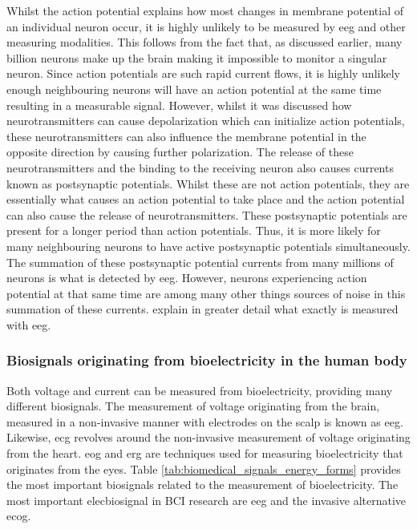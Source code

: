 Whilst the action potential explains how most changes in membrane potential of an individual neuron occur, it is highly unlikely to be measured by \gls{eeg} and other measuring modalities.
This follows from the fact that, as discussed earlier, many billion neurons make up the brain making it impossible to monitor a singular neuron.
Since action potentials are such rapid current flows, it is highly unlikely enough neighbouring neurons will have an action potential at the same time resulting in a measurable signal.
However, whilst it was discussed how neurotransmitters can cause depolarization which can initialize action potentials, these neurotransmitters can also influence the membrane potential in the opposite direction by causing further polarization.
The release of these neurotransmitters and the binding to the receiving neuron also causes currents known as postsynaptic potentials.
Whilst these are not action potentials, they are essentially what causes an action potential to take place and the action potential can also cause the release of neurotransmitters.
These postsynaptic potentials are present for a longer period than action potentials.
Thus, it is more likely for many neighbouring neurons to have active postsynaptic potentials simultaneously.
The summation of these postsynaptic potential currents from many millions of neurons is what is detected by \gls{eeg}.
However, neurons experiencing action potential at that same time are among many other things sources of noise in this summation of these currents.
 explain in greater detail what exactly is measured with \gls{eeg}.




\subsubsection{Biosignals originating from bioelectricity in the human body}
\label{subsubsec:biomedical_signals_biosignals_electrical_biosignals}

Both voltage and current can be measured from bioelectricity, providing many different \glspl{biosignal}.
The measurement of voltage originating from the brain, measured in a non-invasive manner with electrodes on the scalp is known as \gls{eeg}.
Likewise, \gls{ecg} revolves around the non-invasive measurement of voltage originating from the heart.
\Gls{eog} and \gls{erg} are techniques used for measuring bioelectricity that originates from the eyes.
Table \ref{tab:biomedical_signals_energy_forms} provides the most important \glspl{biosignal} related to the measurement of bioelectricity.
The most important \gls{elecbiosignal} in BCI research are \gls{eeg} and the invasive alternative \gls{ecog}.


